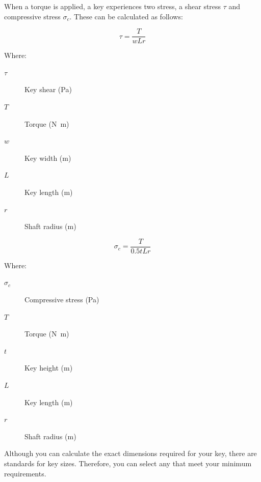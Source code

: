 When a torque is applied, a key experiences two stress, a shear stress \(\tau\) and compressive stress \(\sigma_c\). These can be calculated as follows:


\begin{equation}
  \tau = \frac{T}{wLr}
\end{equation}

\noindent{}Where:

\begin{description}
    \item[\(\tau\)] Key shear (\si{\pascal})
    \item[\(T\)] Torque (\si{\newton\metre})
    \item[\(w\)] Key width (\si{\metre})
    \item[\(L\)] Key length (\si{\metre})
    \item[\(r\)] Shaft radius (\si{\metre})
\end{description}


\begin{equation}
    \sigma_c = \frac{T}{0.5tLr}
\end{equation}

\noindent{}Where:

\begin{description}
    \item[\(\sigma_c\)] Compressive stress (\si{\pascal})
    \item[\(T\)] Torque (\si{\newton\metre})
    \item[\(t\)] Key height (\si{\metre})
    \item[\(L\)] Key length (\si{\metre})
    \item[\(r\)] Shaft radius (\si{\metre})
\end{description}

 Although you can calculate the exact dimensions required for your key, there are standards for key sizes. Therefore, you can select any that meet your minimum requirements.

